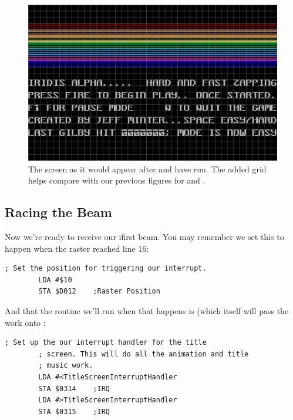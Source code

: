 \begin{figure}[H]
    \begin{adjustbox}{width=13cm,center}
    \includegraphics[width=13cm]{titlescreen/titlescreen_textonly_grid.png}%
    \end{adjustbox}
  \caption{The screen as it would appear after  and  have run. The added
  grid helps compare with our previous figures for  and .}
\end{figure}

\subsection{Racing the Beam}
Now we're ready to receive our ifirst beam. You may remember we set this to happen when the raster reached line 16:

\begin{lstlisting}[caption=In \icode{InitializeSpritesAndInterruptsForTitleScreen}]
        ; Set the position for triggering our interrupt.
        LDA #$10
        STA $D012    ;Raster Position
\end{lstlisting}

And that the routine we'll run when that happens is  (which itself will pass
the work onto :

\begin{lstlisting}[caption=In \icode{InitializeSpritesAndInterruptsForTitleScreen}]
        ; Set up the our interrupt handler for the title
        ; screen. This will do all the animation and title
        ; music work.
        LDA #<TitleScreenInterruptHandler
        STA $0314    ;IRQ
        LDA #>TitleScreenInterruptHandler
        STA $0315    ;IRQ
\end{lstlisting}

